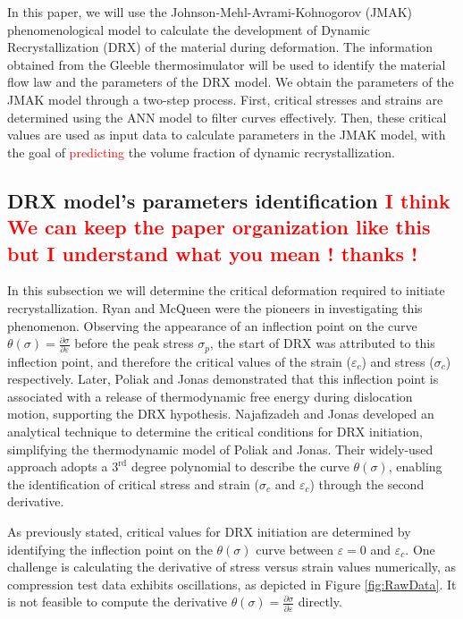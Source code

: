 \documentclass[metals,article,submit,pdftex,moreauthors]{Definitions/mdpi}
\begin{document}
In this paper, we will use the Johnson-Mehl-Avrami-Kohnogorov (JMAK) phenomenological model \cite{Avrami-1939} to calculate the development of Dynamic Recrystallization (DRX) of the material during deformation.
The information obtained from the Gleeble thermosimulator will be used to identify the material flow law and the parameters of the DRX model.
We obtain the parameters of the JMAK model through a two-step process.
First, critical stresses and strains are determined using the ANN model to filter curves effectively.
Then, these critical values are used as input data to calculate parameters in the JMAK model, with the goal of \textcolor{red}{predicting} the volume fraction of dynamic recrystallization.

\subsection{DRX model's parameters identification\label{subsec:DRXParameters} \textcolor{red}{I think We can keep the paper organization like this but I understand what you mean ! thanks !}}

In this subsection we will determine the critical deformation required to initiate recrystallization.
Ryan and McQueen \cite{ryan1989dynamic, ryan1990dynamic, ryan1990flow} were the pioneers in investigating this phenomenon.
Observing the appearance of an inflection point on the curve $\theta(\sigma)=\frac{\partial \sigma}{\partial \varepsilon}$ before the peak stress $\sigma_p$, the start of DRX was attributed to this inflection point, and therefore the critical values of the strain ($\varepsilon_c$) and stress ($\sigma_c$) respectively.
Later, Poliak and Jonas \cite{Poliak-1996, Poliak-2003, Poliak-2003-2, jonas2003critical} demonstrated that this inflection point is associated with a release of thermodynamic free energy during dislocation motion, supporting the DRX hypothesis.
Najafizadeh and Jonas \cite{Najafizadeh-2006} developed an analytical technique to determine the critical conditions for DRX initiation, simplifying the thermodynamic model of Poliak and Jonas.
Their widely-used approach adopts a $3^\text{rd}$ degree polynomial to describe the curve $\theta(\sigma)$, enabling the identification of critical stress and strain ($\sigma_c$ and $\varepsilon_c$) through the second derivative.

As previously stated, critical values for DRX initiation are determined by identifying the inflection point on the $\theta(\sigma)$ curve between $\varepsilon=0$ and $\varepsilon_c$.
One challenge is calculating the derivative of stress versus strain values numerically, as compression test data exhibits oscillations, as depicted in Figure \ref{fig:RawData}.
It is not feasible to compute the derivative $\theta(\sigma)=\frac{\partial \sigma}{\partial \varepsilon}$ directly.
\end{document}
